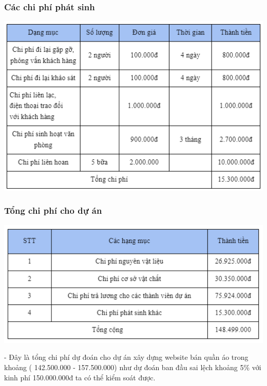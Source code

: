 \documentclass[12pt]{article}
\begin{document}
\subsubsection{Các chi phí phát sinh}
\includegraphics[width=15cm]{ChiPhi12.png}
\vspace{0.5cm}

\subsubsection{Tổng chi phí cho dự án}
\includegraphics[width=15cm]{ChiPhi13.png}
\par
\begin{adjustwidth}{1cm}{0.5cm} %
  - Đây là tổng chi phí dự đoán cho dự án xây dựng website bán quần áo trong khoảng ( 142.500.000 - 157.500.000) như dự đoán ban đầu sai lệch khoảng 5\% với kinh phí 150.000.000đ ta có thể kiểm soát được. 
\end{adjustwidth}
\hspace{1cm}
\end{document}
